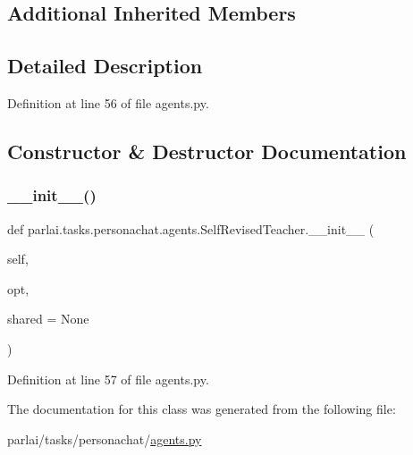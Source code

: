 \subsection*{Additional Inherited Members}


\subsection{Detailed Description}


Definition at line 56 of file agents.\+py.



\subsection{Constructor \& Destructor Documentation}
\mbox{\label{classparlai_1_1tasks_1_1personachat_1_1agents_1_1SelfRevisedTeacher_a7d6545ffc585ee5edc99b2ce5a117aeb}} 
\subsubsection{\texorpdfstring{\+\_\+\+\_\+init\+\_\+\+\_\+()}{\_\_init\_\_()}}
{\footnotesize\ttfamily def parlai.\+tasks.\+personachat.\+agents.\+Self\+Revised\+Teacher.\+\_\+\+\_\+init\+\_\+\+\_\+ (\begin{DoxyParamCaption}\item[{}]{self,  }\item[{}]{opt,  }\item[{}]{shared = {\ttfamily None} }\end{DoxyParamCaption})}



Definition at line 57 of file agents.\+py.



The documentation for this class was generated from the following file\+:\begin{DoxyCompactItemize}
\item 
parlai/tasks/personachat/\hyperlink{parlai_2tasks_2personachat_2agents_8py}{agents.\+py}\end{DoxyCompactItemize}
